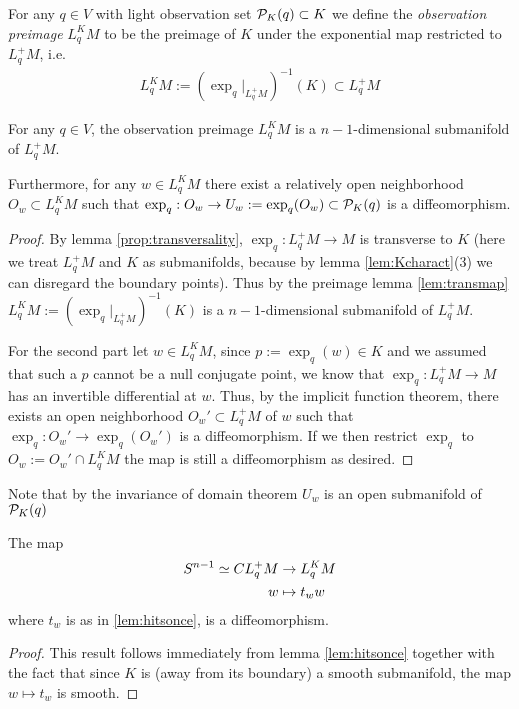 \begin{definition}
For any $q\in V$ with light observation set ${\mathcal{P}}_K(q)\subset K$ we define the \emph{observation preimage} $L^K_qM$ to be the preimage of $K$ under the exponential map restricted to $L^+_qM$, i.e. 
\begin{align*}
    L^K_qM := (\exp_q\rvert_{L^+_qM})^{-1}(K) \subset L^+_qM
\end{align*}
\end{definition}
\begin{lemma}\label{lem:preimage}
For any $q\in V$, the observation preimage $L^K_qM$ is a $n-1$-dimensional submanifold of $L^+_qM$. 

Furthermore, for any $w\in L^K_qM$ there exist a relatively open neighborhood $O_w\subset L^K_qM$ such that $\exp_q:O_w\to U_w:=\exp_q(O_w)\subset {\mathcal{P}}_K(q)$ is a diffeomorphism.
\end{lemma}
\begin{proof}
    By lemma \ref{prop:transversality}, $\exp_q:L^+_qM\to M$ is transverse to $K$ (here we treat $L^+_qM$ and $K$ as submanifolds, because by lemma \ref{lem:Kcharact}(3) we can disregard the boundary points). Thus by the preimage lemma \ref{lem:transmap} $ L^K_qM := (\exp_q\rvert_{L^+_qM})^{-1}(K)$ is a $n-1$-dimensional submanifold of $L^+_qM$.

    For the second part let $w\in L^K_qM$, since $p:=\exp_q(w)\in K$ and we assumed that such a $p$ cannot be a null conjugate point, we know that $\exp_q:L^+_qM\to M$ has an invertible differential at $w$. Thus, by the implicit function theorem, there exists an open neighborhood $O_w'\subset L^+_qM$ of $w$ such that $\exp_q:O_w'\to \exp_q(O_w')$ is a diffeomorphism. If we then restrict $\exp_q$ to $O_w:=O_w' \cap L^K_qM$ the map is still a diffeomorphism as desired.
\end{proof}
Note that by the invariance of domain theorem $U_w$ is an open submanifold of ${\mathcal{P}}_K(q)$

\begin{corollary}\label{cor:lksn}
    The map 
    \begin{align*}
        {S^{n-1}} \simeq CL^+_qM &\to L^K_qM\\
        w &\mapsto t_ww
    \end{align*}
    where $t_w$ is as in \ref{lem:hitsonce}, is a diffeomorphism.
\end{corollary}
\begin{proof}
    This result follows immediately from lemma \ref{lem:hitsonce} together with the fact that since $K$ is (away from its boundary) a smooth submanifold, the map $w\mapsto t_w$ is smooth.
\end{proof}

